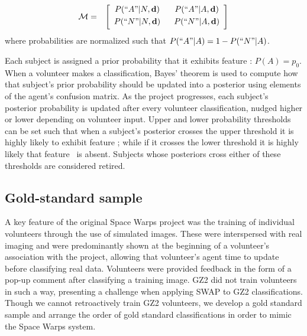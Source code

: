 \begin{eqnarray}
\mathcal{M} & = & \left[
	\begin{array}{cc}
		P(``A"|N, \mathbf{d}) ~~& P(``A" | A, \mathbf{d}) \\[0.3em]
		P(``N"|N, \mathbf{d})~~& P(``N"|A, \mathbf{d}) \\[0.3em]
	\end{array}\right]
\end{eqnarray}
where probabilities are normalized such that $P(``A"|A) = 1- P(``N" | A) $.


Each subject is assigned a prior probability that it exhibits feature \A: $P(A) = p_0$. When a volunteer makes a classification, Bayes' theorem is used to compute how that subject's prior probability should be updated into a posterior using elements of the agent's confusion matrix. As the project progresses, each subject's posterior probability is updated after every volunteer classification, nudged higher or lower depending on volunteer input. Upper and lower probability thresholds can be set such that when a subject's posterior crosses the upper threshold it is highly likely to exhibit feature \A; while if it crosses the lower threshold it is highly likely that feature \A~is absent. Subjects whose posteriors cross either of these thresholds are considered retired.


\subsection{Gold-standard sample}\label{chap3: training sample}

A key feature of the original Space Warps project was the training of individual volunteers through the use of simulated images. These were interspersed with real imaging and were predominantly shown at the beginning of a volunteer's association with the project, allowing that volunteer's agent time to update before classifying real data. Volunteers were provided feedback in the form of a pop-up comment after classifying a training image. GZ2 did not train volunteers in such a way, presenting a challenge when applying SWAP to GZ2 classifications. Though we cannot retroactively train GZ2 volunteers, we develop a gold standard sample and arrange the order of gold standard classifications in order to mimic the Space Warps system.


